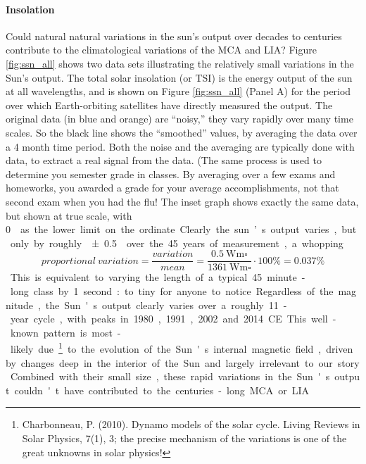 \documentclass[amstex,12pt]{book}
\begin{document}
\paragraph{Insolation}
Could natural natural variations in the sun’s output over decades to centuries contribute to the climatological variations of the MCA and LIA? Figure \ref{fig:ssn_all} shows two data sets illustrating the relatively small variations in the Sun's output. The total solar insolation (or TSI) is the energy output of the sun at all wavelengths, and is shown on Figure \ref{fig:ssn_all} (Panel A) for the period over which Earth-orbiting satellites have directly measured the output. The original data (in blue and orange) are ``noisy,'' they vary rapidly over many time scales. So the black line shows the ``smoothed'' values, by averaging the data over a 4 month time period. Both the noise and the averaging are typically done with data, to extract a real signal from the data. (The same process is used to determine you semester grade in classes. By averaging over a few exams and homeworks, you awarded a grade for your average accomplishments, not that second exam when you had the flu! The inset graph shows exactly the same data, but shown at true scale, with \SI{0}{\watt\metre\square} as the lower limit on the ordinate. Clearly the sun’s output varies, but only by roughly \SI{\pm 0.5}{\watt\metre\square} over the 45 years of measurement, a whopping
\begin{equation}
	proportional\ variation=\frac{variation}{mean}=\frac{\SI{0.5}{\watt\metre\square}}{\SI{1361}{\watt\metre\square}}\cdot100\%=0.037\%
\end{equation}
This is equivalent to varying the length of a typical 45 minute-long class by 1 second: to tiny for anyone to notice. Regardless of the magnitude, the Sun's output clearly varies over a roughly 11-year cycle, with peaks in 1980, 1991, 2002 and 2014 CE. This well-known pattern is most-likely due\footnote{Charbonneau, P. (2010). Dynamo models of the solar cycle. Living Reviews in Solar Physics, 7(1), 3; the precise mechanism of the variations is one of the great unknowns in solar physics!} to the evolution of the Sun's internal magnetic field, driven by changes deep in the interior of the Sun and largely irrelevant to our story. Combined with their small size, these rapid variations in the Sun's output couldn't have contributed to the centuries-long MCA or LIA.\\
\end{document}
